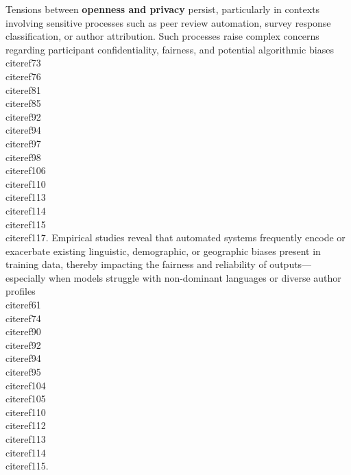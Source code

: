 \documentclass[11pt]{article}
\begin{document}
Tensions between \textbf{openness and privacy} persist, particularly in contexts involving sensitive processes such as peer review automation, survey response classification, or author attribution. Such processes raise complex concerns regarding participant confidentiality, fairness, and potential algorithmic biases \\cite{ref73}\\cite{ref76}\\cite{ref81}\\cite{ref85}\\cite{ref92}\\cite{ref94}\\cite{ref97}\\cite{ref98}\\cite{ref106}\\cite{ref110}\\cite{ref113}\\cite{ref114}\\cite{ref115}\\cite{ref117}. Empirical studies reveal that automated systems frequently encode or exacerbate existing linguistic, demographic, or geographic biases present in training data, thereby impacting the fairness and reliability of outputs—especially when models struggle with non-dominant languages or diverse author profiles \\cite{ref61}\\cite{ref74}\\cite{ref90}\\cite{ref92}\\cite{ref94}\\cite{ref95}\\cite{ref104}\\cite{ref105}\\cite{ref110}\\cite{ref112}\\cite{ref113}\\cite{ref114}\\cite{ref115}.
\end{document}
